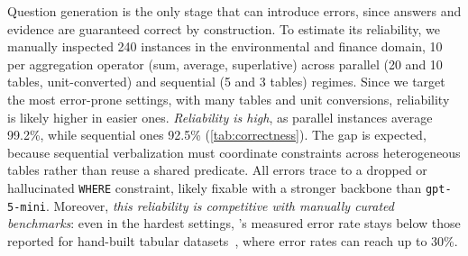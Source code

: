 
Question generation is the only \name stage that can introduce errors, since answers and evidence are guaranteed correct by construction. To estimate its reliability, we manually inspected 240 instances in the environmental and finance domain, 10 per aggregation operator (sum, average, superlative) across parallel (20 and 10 tables, unit-converted) and sequential (5 and 3 tables) regimes. Since we target the most error-prone settings, with many tables and unit conversions, reliability is likely higher in easier ones. %
\emph{Reliability is high}, as parallel instances average 99.2\%, while sequential ones 92.5\% (\autoref{tab:correctness}). The gap is expected, because sequential verbalization must coordinate constraints across heterogeneous tables rather than reuse a shared predicate. All errors trace to a dropped or hallucinated \texttt{WHERE} constraint, likely fixable with a stronger backbone than \texttt{gpt-5-mini}. Moreover, \emph{this reliability is competitive with manually curated benchmarks}: even in the hardest settings, %
\name's measured error rate stays below those reported for hand-built tabular datasets~\cite{5.8}, where error rates can reach up to 30\%. 

